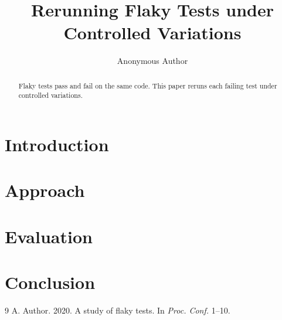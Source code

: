 \documentclass[acmsmall,screen,review,anonymous]{acmart}
\begin{document}
\title{Rerunning Flaky Tests under Controlled Variations}
\author{Anonymous Author}
\begin{abstract}
Flaky tests pass and fail on the same code. This paper reruns each failing test under controlled variations.
\end{abstract}
\maketitle
\section{Introduction}

\section{Approach}

\section{Evaluation}

\section{Conclusion}

\begin{thebibliography}{9}
 A. Author. 2020. A study of flaky tests. In \emph{Proc. Conf.} 1--10.
\end{thebibliography}
\end{document}
